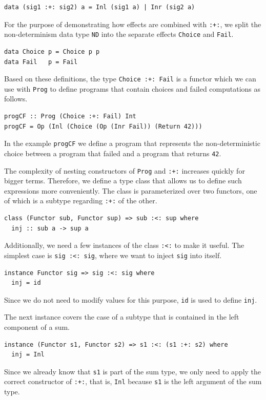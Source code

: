 \documentclass[a4paper, 11pt, fleqn, twoside, abstract=on]{scrreprt}
\newcommand{\hinl}[1]{\texttt{#1}}
\newcommand{\cinl}[1]{\texttt{#1}}
\begin{document}
\begin{verbatim}
data (sig1 :+: sig2) a = Inl (sig1 a) | Inr (sig2 a)
\end{verbatim}
\noindent
For the purpose of demonstrating how effects are combined with \cinl{:+:}, we split the non-determinism data type \hinl{ND} into the separate effects \hinl{Choice} and \hinl{Fail}.

\begin{verbatim}
data Choice p = Choice p p
data Fail   p = Fail
\end{verbatim}
\noindent
Based on these definitions, the type \hinl{Choice :+: Fail} is a functor which we can use with \hinl{Prog} to define programs that contain choices and failed computations as follows.

\begin{verbatim}
progCF :: Prog (Choice :+: Fail) Int
progCF = Op (Inl (Choice (Op (Inr Fail)) (Return 42)))
\end{verbatim}
\noindent
In the example \hinl{progCF} we define a program that represents the non-deterministic choice between a program that failed and a program that returns \hinl{42}.

The complexity of nesting constructors of \hinl{Prog} and \hinl{:+:} increases quickly for bigger terms.
Therefore, we define a type class that allows us to define such expressions more conveniently.
The class is parameterized over two functors, one of which is a subtype regarding \hinl{:+:} of the other.

\begin{verbatim}
class (Functor sub, Functor sup) => sub :<: sup where
  inj :: sub a -> sup a
\end{verbatim}
\noindent
Additionally, we need a few instances of the class \hinl{:<:} to make it useful.
The simplest case is \hinl{sig :<: sig}, where we want to inject \hinl{sig} into itself.

\begin{verbatim}
instance Functor sig => sig :<: sig where
  inj = id  
\end{verbatim}
\noindent
Since we do not need to modify values for this purpose, \hinl{id} is used to define \hinl{inj}.

The next instance covers the case of a subtype that is contained in the left component of a sum.

\begin{verbatim}
instance (Functor s1, Functor s2) => s1 :<: (s1 :+: s2) where
  inj = Inl
\end{verbatim}
\noindent
Since we already know that \hinl{s1} is part of the sum type, we only need to apply the correct constructor of \hinl{:+:}, that is, \hinl{Inl} because \hinl{s1} is the left argument of the sum type.
\end{document}
